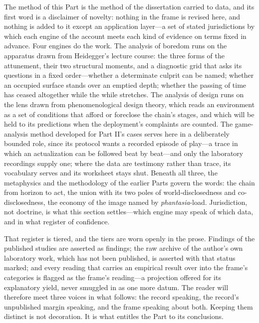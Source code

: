 \documentclass{article}
\begin{document}
The method of this Part is the method of the dissertation carried to data, and its first word is a disclaimer of novelty: nothing in the frame is revised here, and nothing is added to it except an application layer---a set of stated jurisdictions by which each engine of the account meets each kind of evidence on terms fixed in advance. Four engines do the work. The analysis of boredom runs on the apparatus drawn from Heidegger's lecture course: the three forms of the attunement, their two structural moments, and a diagnostic grid that asks its questions in a fixed order---whether a determinate culprit can be named; whether an occupied surface stands over an emptied depth; whether the passing of time has ceased altogether while the while stretches. The analysis of design runs on the lens drawn from phenomenological design theory, which reads an environment as a set of conditions that afford or foreclose the chain's stages, and which will be held to its predictions when the deployment's complaints are counted. The game-analysis method developed for Part II's cases serves here in a deliberately bounded role, since its protocol wants a recorded episode of play---a trace in which an actualization can be followed beat by beat---and only the laboratory recordings supply one; where the data are testimony rather than trace, its vocabulary serves and its worksheet stays shut. Beneath all three, the metaphysics and the methodology of the earlier Parts govern the words: the chain from horizon to act, the union with its two poles of world-disclosedness and co-disclosedness, the economy of the image named by \textit{phantasia}-load. Jurisdiction, not doctrine, is what this section settles---which engine may speak of which data, and in what register of confidence.

That register is tiered, and the tiers are worn openly in the prose. Findings of the published studies are asserted as findings; the raw archive of the author's own laboratory work, which has not been published, is asserted with that status marked; and every reading that carries an empirical result over into the frame's categories is flagged as the frame's reading---a projection offered for its explanatory yield, never smuggled in as one more datum. The reader will therefore meet three voices in what follows: the record speaking, the record's unpublished margin speaking, and the frame speaking about both. Keeping them distinct is not decoration. It is what entitles the Part to its conclusions.
\end{document}
